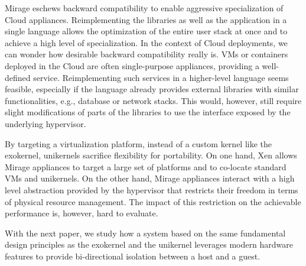 Mirage eschews backward compatibility to enable aggressive specialization of Cloud appliances.
Reimplementing the libraries as well as the application in a single language allows the optimization of the entire user stack at once and to achieve a high level of specialization.
In the context of Cloud deployments, we can wonder how desirable backward compatibility really is.
VMs or containers deployed in the Cloud are often single-purpose appliances, providing a well-defined service.
Reimplementing such services in a higher-level language seems feasible, especially if the language already provides external libraries with similar functionalities, e.g., database or network stacks.
This would, however, still require slight modifications of parts of the libraries to use the interface exposed by the underlying hypervisor.

By targeting a virtualization platform, instead of a custom kernel like the exokernel, unikernels sacrifice flexibility for portability.
On one hand, Xen allows Mirage appliances to target a large set of platforms and to co-locate standard VMs and unikernels.
On the other hand, Mirage appliances interact with a high level abstraction provided by the hypervisor that restricts their freedom in terms of physical resource management.
The impact of this restriction on the achievable performance is, however, hard to evaluate.

With the next paper, we study how a system based on the same fundamental design principles as the exokernel and the unikernel leverages modern hardware features to provide bi-directional isolation between a host and a guest.


